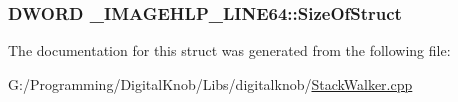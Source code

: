 \hypertarget{struct___i_m_a_g_e_h_l_p___l_i_n_e64_add67362ebbf03475b285efcb2573d0ef}{
\subsubsection[{Size\-Of\-Struct}]{\setlength{\rightskip}{0pt plus 5cm}D\-W\-O\-R\-D \-\_\-\-I\-M\-A\-G\-E\-H\-L\-P\-\_\-\-L\-I\-N\-E64\-::\-Size\-Of\-Struct}}\label{struct___i_m_a_g_e_h_l_p___l_i_n_e64_add67362ebbf03475b285efcb2573d0ef}


The documentation for this struct was generated from the following file\-:\begin{DoxyCompactItemize}
\item 
G\-:/\-Programming/\-Digital\-Knob/\-Libs/digitalknob/\hyperlink{_stack_walker_8cpp}{Stack\-Walker.\-cpp}\end{DoxyCompactItemize}
